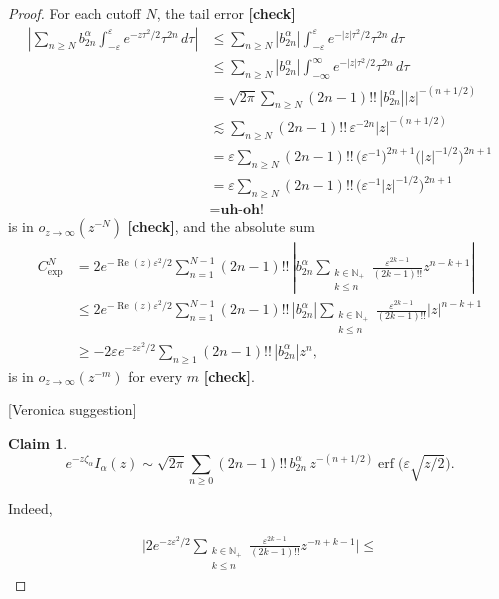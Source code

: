 \documentclass{article}
\theoremstyle{definition}
\newtheorem{claim}[definition]{Claim}
\begin{document}
\begin{proof}
\color{Purple}
For each cutoff $N$, the tail error \textbf{[check]}
\begin{align*}
\left| \sum_{n \ge N} b_{2n}^\alpha \int_{-\varepsilon}^\varepsilon e^{-z\tau^2/2} \tau^{2n}\,d\tau \right| & \le \sum_{n \ge N} \left| b_{2n}^\alpha \right| \int_{-\varepsilon}^\varepsilon e^{-|z|\tau^2/2} \tau^{2n}\,d\tau \\
& \le \sum_{n \ge N} \left| b_{2n}^\alpha \right| \int_{-\infty}^\infty e^{-|z|\tau^2/2} \tau^{2n}\,d\tau \\
& = \sqrt{2\pi} \sum_{n \ge N} (2n-1)!!\,\left| b_{2n}^\alpha \right| |z|^{-(n+1/2)} \\
& \lesssim \sum_{n \ge N} (2n-1)!!\,\varepsilon^{-2n} |z|^{-(n+1/2)} \\
& = \varepsilon \sum_{n \ge N} (2n-1)!!\,\big(\varepsilon^{-1}\big)^{2n+1} \big(|z|^{-1/2}\big)^{2n+1} \\
& = \varepsilon \sum_{n \ge N} (2n-1)!!\,\big(\varepsilon^{-1} |z|^{-1/2}\big)^{2n+1} \\
& = \textbf{uh-oh!}
\end{align*}
\color{violet}
is in $o_{z \to \infty}(z^{-N})$ \textbf{[check]}, and the absolute sum
\begin{align*}
C_\text{exp}^N & = 2e^{-\operatorname{Re}(z)\varepsilon^2/2} \sum_{n = 1}^{N-1} (2n-1)!!\,\left| b_{2n}^\alpha \sum_{\substack{k \in \mathbb{N}_+ \\ k \le n}} \frac{\varepsilon^{2k-1}}{(2k-1)!!} z^{n-k+1} \right| \\
& \le 2e^{-\operatorname{Re}(z)\varepsilon^2/2} \sum_{n = 1}^{N-1} (2n-1)!!\,\left|b_{2n}^\alpha\right| \sum_{\substack{k \in \mathbb{N}_+ \\ k \le n}} \frac{\varepsilon^{2k-1}}{(2k-1)!!} |z|^{n-k+1} \\
& \ge -2\varepsilon e^{-z\varepsilon^2/2} \sum_{n \ge 1} (2n-1)!!\,\left|b_{2n}^\alpha\right| z^n,
\end{align*}
is in $o_{z \to \infty}(z^{-m})$ for every $m$ \textbf{[check]}.

\color{magenta}
[Veronica suggestion]

\begin{claim}
    \[ e^{-z\zeta_\alpha} I_\alpha(z) \sim \sqrt{2\pi} \sum_{n \ge 0} (2n-1)!!\,b_{2n}^\alpha\,z^{-(n+1/2)} \operatorname{erf}\big(\varepsilon \sqrt{z/2}\big). \]
\end{claim}

Indeed, 

\begin{align*}
    \Bigg | 2e^{-z\varepsilon^2/2} \sum_{\substack{k \in \mathbb{N}_+ \\ k \le n}} \frac{\varepsilon^{2k-1}}{(2k-1)!!} z^{-n+k-1} \Bigg | \leq 
\end{align*}
 

\end{proof}
\end{document}
